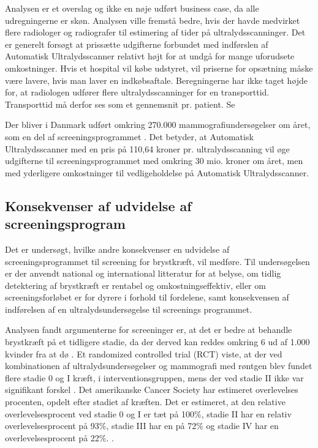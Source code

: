 Analysen er et overslag og ikke en nøje udført business case, da alle udregningerne er skøn. Analysen ville fremstå bedre, hvis der havde medvirket flere radiologer og radiografer til estimering af tider på ultralydsscanninger. Det er generelt forsøgt at prissætte udgifterne forbundet med indførslen af Automatisk Ultralydsscanner relativt højt for at undgå for mange uforudsete omkostninger. Hvis et hospital vil købe udstyret, vil priserne for opsætning måske være lavere, hvis man laver en indkøbsaftale. Beregningerne har ikke taget højde for, at radiologen udfører flere ultralydsscanninger for en transporttid. Transporttid må derfor ses som et gennemsnit pr. patient. Se 

Der bliver i Danmark udført omkring 270.000 mammografiundersøgelser om året, som en del af screeningsprogrammet \cite{esundhed}. Det betyder, at Automatisk Ultralydsscanner med en pris på 110,64 kroner pr. ultralydsscanning vil øge udgifterne til screeningsprogrammet med omkring 30 mio. kroner om året, men med yderligere omkostninger til vedligeholdelse på Automatisk Ultralydsscanner. 

\subsection{Konsekvenser af udvidelse af screeningsprogram} 
Det er undersøgt, hvilke andre konsekvenser en udvidelse af screeningsprogrammet til screening for brystkræft, vil medføre. Til undersøgelsen er der anvendt national og international litteratur for at belyse, om tidlig detektering af brystkræft er rentabel og omkostningseffektiv, eller om screeningsforløbet er for dyrere i forhold til fordelene, samt konsekvensen af indførelsen af en ultralydsundersøgelse til screenings programmet. 

Analysen fandt argumenterne for screeninger er, at det er bedre at behandle brystkræft på et tidligere stadie, da der derved kan reddes omkring 6 ud af 1.000 kvinder fra at dø \cite{Argumenter}. Et randomized controlled trial (RCT) viste, at der ved kombinationen af ultralydsundersøgelser og mammografi med røntgen blev fundet flere stadie 0 og I kræft, i interventionsgruppen, mens der ved stadie II ikke var signifikant forskel \cite{Japan}. 
Det amerikanske Cancer Society har estimeret overlevelses procenten, opdelt efter stadiet af kræften. Det er estimeret, at den relative overlevelsesprocent ved stadie 0 og I er tæt på 100\%, stadie II har en relativ overlevelsesprocent på 93\%, stadie III har en på 72\% og stadie IV har en overlevelsesprocent på 22\%. \cite{CancerSociety}. 

